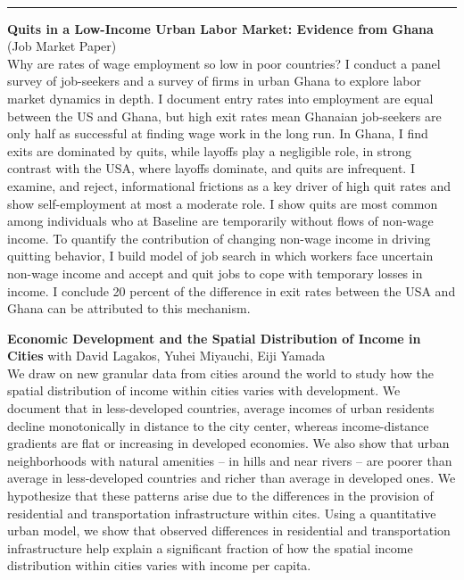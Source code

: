 \documentclass[12pt]{article}
\begin{document}
\newpage
\thispagestyle{plain}
 \\
\rule{\textwidth}{1pt}

\noindent \textbf{Quits in a Low-Income Urban Labor Market: Evidence from Ghana} (Job Market Paper)
\vspace{5pt}\\
\noindent Why are rates of wage employment so low in poor countries? I conduct a panel survey of job-seekers and a survey of firms in urban Ghana to explore labor market dynamics in depth. I document entry rates into employment are equal between the US and Ghana, but high exit rates mean Ghanaian job-seekers are only half as successful at finding wage work in the long run. In Ghana, I find exits are dominated by quits, while layoffs play a negligible role, in strong contrast with the USA, where layoffs dominate, and quits are infrequent. I examine, and reject, informational frictions as a key driver of high quit rates and show self-employment at most a moderate role. I show quits are most common among individuals who at Baseline are temporarily without flows of non-wage income. To quantify the contribution of changing non-wage income in driving quitting behavior, I build model of job search in which workers face uncertain non-wage income and accept and quit jobs to cope with temporary losses in income. I conclude 20 percent of the difference in exit rates between the USA and Ghana can be attributed to this mechanism.\\
\vspace*{5pt}


\noindent \textbf{Economic Development and the Spatial Distribution of Income in Cities} with David Lagakos, Yuhei Miyauchi, Eiji Yamada
\vspace{5pt}\\
\noindent We draw on new granular data from cities around the world to study how the spatial distribution of income within cities varies with development. We document that in less-developed countries, average incomes of urban residents decline monotonically in distance to the city center, whereas income-distance gradients are flat or increasing in developed economies. We also show that urban neighborhoods with natural amenities  -- in hills and near rivers -- are poorer than average in less-developed countries and richer than average in developed ones. We hypothesize that these patterns arise due to the differences in the provision of residential and transportation infrastructure within cites. Using a quantitative urban model, we show that observed differences in residential and transportation infrastructure help explain a significant fraction of how the spatial income distribution within cities varies with income per capita.

\end{document}
